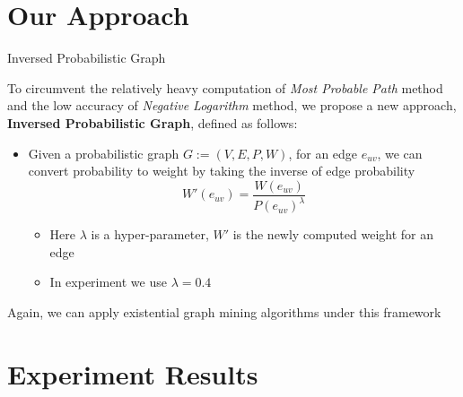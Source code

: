 \documentclass[9pt]{beamer}
\begin{document}

\section{Our Approach}
\begin{frame}[fragile]{Inversed Probabilistic Graph}



To circumvent the relatively heavy computation of \textit{Most Probable Path} method and the low accuracy of \textit{Negative Logarithm} method, we propose a new approach, \textbf{Inversed Probabilistic Graph}, defined as follows:
\begin{itemize}
\item Given a probabilistic graph $G:=(V,E,P,W)$, for an edge $e_{uv}$, we can convert probability to weight by taking the inverse of edge probability
\[ W'(e_{uv}) = \frac{W(e_{uv})}{P(e_{uv})^\lambda }\]
\vspace{-0.15in}
\begin{itemize}
\item Here $\lambda$ is a hyper-parameter, $W'$ is the newly computed weight for an edge
\item In experiment we use $\lambda = 0.4$
\end{itemize}
\end{itemize}
Again, we can apply existential graph mining algorithms under this framework
\end{frame}

\section{Experiment Results}
\end{document}
